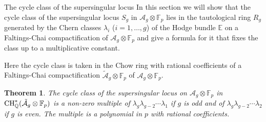 \documentclass[11pt]{amsart}
\numberwithin{equation}{section}
\newcommand{\EE}{\mathbb E}
\newcommand{\FF}{\mathbb F}
\newcommand{\QQ}{\mathbb Q}
\newtheorem{theorem}{Theorem}[section]
\theoremstyle{definition}
\theoremstyle{remark}
\begin{document}
\begin{section}{The cycle class of the supersingular locus}\label{class-section}
In this section we will show that the 
cycle class of the supersingular 
locus $S_g$ in $\mathcal{A}_g\otimes {\FF}_p$ lies in the
tautological ring $R_g$ generated by the Chern classes $\lambda_i$ 
($i=1,\ldots,g$) of the Hodge
bundle ${\EE}$ 
on a Faltings-Chai compactification of $\mathcal{A}_g\otimes {\FF}_p$ and give a formula for it that fixes the class
up to a multiplicative constant.  

Here the cycle class is taken
in the Chow ring with rational coefficients 
of a Faltings-Chai compactification 
$\tilde{\mathcal{A}}_g \otimes {\FF}_p$ of $\mathcal{A}_g \otimes {\FF}_p$.

\begin{theorem}\label{NPlociThm}
The cycle class of the supersingular locus on
$\mathcal{A}_g\otimes {\FF}_p$ in ${\rm CH}_{\QQ}^{*}(\tilde{\mathcal{A}}_g\otimes {\FF}_p)$
is a non-zero
multiple of $\lambda_g \lambda_{g-2} \cdots \lambda_{1}$ if $g$ is odd
and of  $\lambda_g \lambda_{g-2} \cdots \lambda_{2}$ if $g$ is even. 
The multiple is a polynomial in $p$ with rational coefficients.
\end{theorem}


\end{section}
\end{document}
